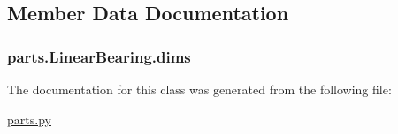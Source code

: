 \subsection{Member Data Documentation}
\hypertarget{classparts_1_1_linear_bearing_aa5cfb7b566d410938e2fdaac7e3460b9}{}
\subsubsection[{dims}]{\setlength{\rightskip}{0pt plus 5cm}parts.\+Linear\+Bearing.\+dims}\label{classparts_1_1_linear_bearing_aa5cfb7b566d410938e2fdaac7e3460b9}


The documentation for this class was generated from the following file\+:\begin{DoxyCompactItemize}
\item 
\hyperlink{parts_8py}{parts.\+py}\end{DoxyCompactItemize}

